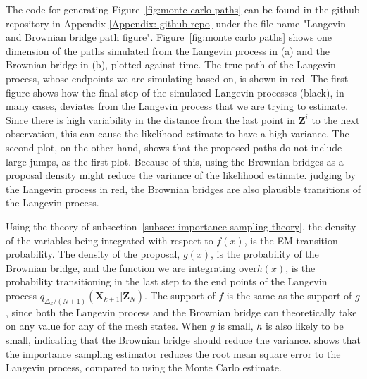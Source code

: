 The code for generating Figure~\ref{fig:monte carlo paths} can be found in the github repository in Appendix \ref{Appendix: github repo} under the file name "Langevin and Brownian bridge path figure". Figure~\ref{fig:monte carlo paths} shows one dimension of the paths simulated from the Langevin process in (a) and the Brownian bridge in (b), plotted against time. The true path of the Langevin process, whose endpoints we are simulating based on, is shown in red. The first figure shows how the final step of the simulated Langevin processes (black), in many cases, deviates from the Langevin process that we are trying to estimate. Since there is high variability in the distance from the last point in $\textbf{Z}^i$ to the next observation, this can cause the likelihood estimate to have a high variance. The second plot, on the other hand, shows that the proposed paths do not include large jumps, as the first plot. Because of this, using the Brownian bridges as a proposal density might reduce the variance of the likelihood estimate. judging by the Langevin process in red, the Brownian bridges are also plausible transitions of the Langevin process. 


Using the theory of subsection~\ref{subsec: importance sampling theory}, the density of the variables being integrated with respect to $f(x)$, is the EM transition probability. The density of the proposal, $g(x)$, is the probability of the Brownian bridge, and the function we are integrating over$h(x)$, is the probability transitioning in the last step to the end points of the Langevin process $q_{\Delta_k/(N+1)}(\textbf{X}_{k+1}|\textbf{Z}_N)$. The support of $f$ is the same as the support of $g$, since both the Langevin process and the Brownian bridge can theoretically take on any value for any of the mesh states. When $g$ is small, $h$ is also likely to be small, indicating that the Brownian bridge should reduce the variance. \parencite{durham_numerical_2002}  shows that the importance sampling estimator reduces the root mean square error to the Langevin process, compared to using the Monte Carlo estimate.


